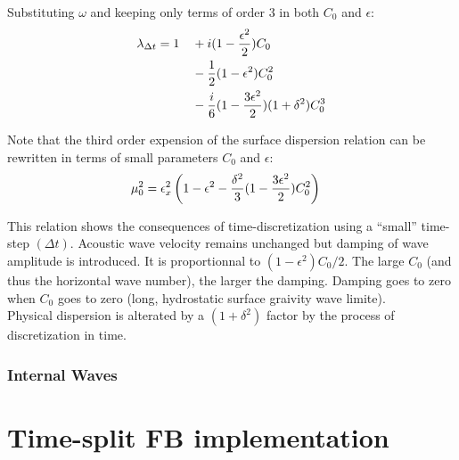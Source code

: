 \documentclass[a4paper]{article}
\numberwithin{equation}{section}
\begin{document}
Substituting $\omega$ and keeping only terms of order 3 in both $C_0$ and $\epsilon$:
   \begin{equation}
   \begin{split}
    \displaystyle
     &\lambda_{\Delta t}= 1 && +i(1-\frac{\epsilon^2}{2})C_0\\
     & &&-\frac{1}{2}(1-\epsilon^2)C_0^2\\
     & &&-\frac{i}{6}(1-\frac{3\epsilon^2}{2})
     (1+\delta^2)C_0^3
   \end{split}
 \end{equation}
\label{lambda_ana}

Note that the third order expension of the surface dispersion relation can be rewritten in terms of small parameters $C_0$ and $\epsilon$:
  \begin{equation}
    \begin{split}
      \displaystyle
      &\mu_0^2=\epsilon_x^2\left(1-\epsilon^2
      -\frac{\delta^2}{3}(1-\frac{3\epsilon^2}{2})C_0^2 \right)
    \end{split}
  \end{equation}
  \label{dispers_ana}

This relation shows the consequences of time-discretization using a ``small'' time-step $(\Delta t)$. Acoustic wave velocity remains unchanged but damping of wave amplitude is introduced. It is proportionnal to $(1-\epsilon^2)C_0/2$. The large $C_0$ (and thus the horizontal wave number), the larger the damping. Damping goes to zero when $C_0$ goes to zero (long, hydrostatic surface graivity wave limite).\\
Physical dispersion is alterated by a $(1+\delta^2)$ factor by the process of discretization in time.\\

\subsubsection{Internal Waves}



\newpage
\section{Time-split FB implementation}
\end{document}
